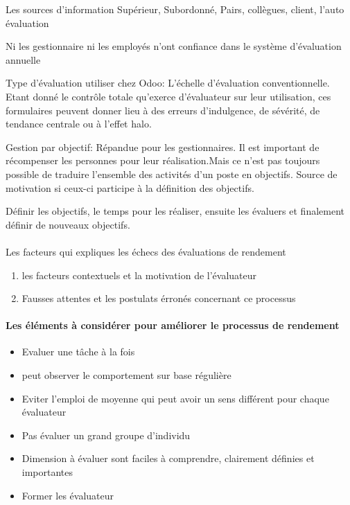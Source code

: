 Les sources d'information
Supérieur, Subordonné, Pairs, collègues, client, l'auto évaluation 

Ni les gestionnaire ni les employés n'ont confiance dans le système d'évaluation annuelle

Type d'évaluation utiliser chez Odoo: L'échelle d'évaluation conventionnelle.
Etant donné le contrôle totale qu'exerce d'évaluateur sur leur utilisation, ces formulaires peuvent donner lieu à des erreurs
d'indulgence, de sévérité, de tendance centrale ou à l'effet halo. 


Gestion par objectif: Répandue pour les gestionnaires. Il est important de récompenser les personnes pour leur réalisation.Mais ce n'est pas toujours possible de traduire l'ensemble des activités d'un poste en objectifs. 
Source de motivation si ceux-ci participe à la définition des objectifs. 

Définir les objectifs, le temps pour les réaliser, ensuite les évaluers et finalement définir de nouveaux objectifs. 


\paragraph{}{Les facteurs qui expliques les échecs des évaluations de rendement}
\begin{enumerate}
    \item les facteurs contextuels et la motivation de l'évaluateur
    \item Fausses attentes et les postulats érronés concernant ce processus
\end{enumerate}

\paragraph{Les éléments à considérer pour améliorer le processus de rendement}
\begin{itemize}
    \item Evaluer une tâche à la fois
    \item peut observer le comportement sur base régulière
    \item Eviter l'emploi de moyenne qui peut avoir un sens différent pour chaque évaluateur
    \item Pas évaluer un grand groupe d'individu
    \item Dimension à évaluer sont faciles à comprendre, clairement définies et importantes
    \item Former les évaluateur
    
\end{itemize}


